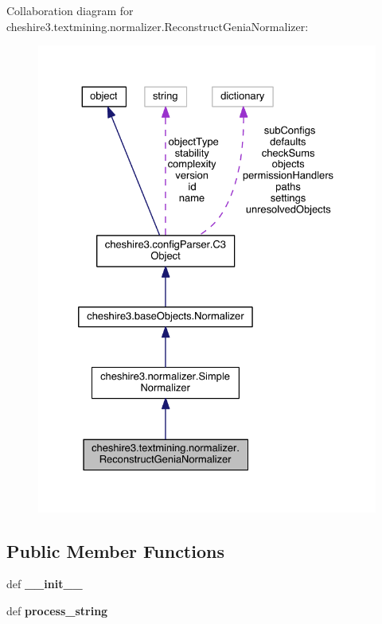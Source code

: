 Collaboration diagram for cheshire3.\-textmining.\-normalizer.\-Reconstruct\-Genia\-Normalizer\-:
\nopagebreak
\begin{figure}[H]
\begin{center}
\leavevmode
\includegraphics[width=328pt]{classcheshire3_1_1textmining_1_1normalizer_1_1_reconstruct_genia_normalizer__coll__graph}
\end{center}
\end{figure}
\subsection*{Public Member Functions}
\begin{DoxyCompactItemize}
\item 
\hypertarget{classcheshire3_1_1textmining_1_1normalizer_1_1_reconstruct_genia_normalizer_a695b105439670fc1d6d3e7d5338015d8}{def {\bfseries \-\_\-\-\_\-init\-\_\-\-\_\-}}\label{classcheshire3_1_1textmining_1_1normalizer_1_1_reconstruct_genia_normalizer_a695b105439670fc1d6d3e7d5338015d8}

\item 
\hypertarget{classcheshire3_1_1textmining_1_1normalizer_1_1_reconstruct_genia_normalizer_af48f6d8c86d12ce9394fe47cd0b7b6b1}{def {\bfseries process\-\_\-string}}\label{classcheshire3_1_1textmining_1_1normalizer_1_1_reconstruct_genia_normalizer_af48f6d8c86d12ce9394fe47cd0b7b6b1}

\end{DoxyCompactItemize}
